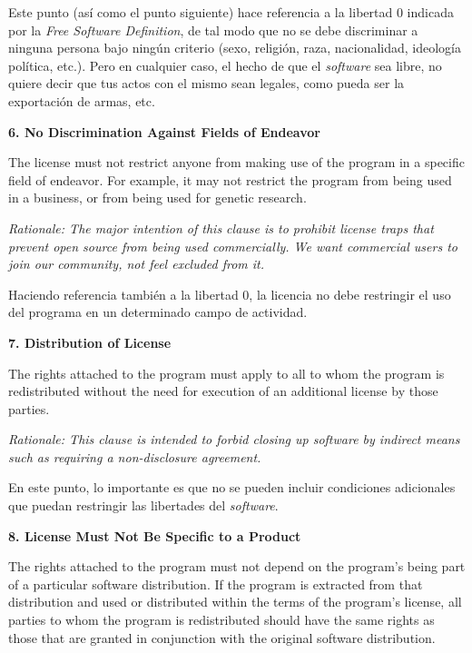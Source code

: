Este punto (así como el punto siguiente) hace referencia a la libertad 0
indicada por la \textit{Free Software Definition}, de tal modo que no se debe
discriminar a ninguna persona bajo ningún criterio (sexo, religión, raza,
nacionalidad, ideología política, etc.). Pero en cualquier caso, el hecho de que
el \textit{software} sea libre, no quiere decir que tus actos con el mismo sean
legales, como pueda ser la exportación de armas, etc.\newline

{\bf 6. No Discrimination Against Fields of Endeavor

The license must not restrict anyone from making use of the program in a
specific field of endeavor. For example, it may not restrict the program from
being used in a business, or from being used for genetic research.}

\textit{Rationale: The major intention of this clause is to prohibit license
traps that prevent open source from being used commercially. We want commercial
users to join our community, not feel excluded from it.}\newline

Haciendo referencia también a la libertad 0, la licencia no debe restringir el
uso del programa en un determinado campo de actividad.\newline

{\bf 7. Distribution of License

The rights attached to the program must apply to all to whom the program is
redistributed without the need for execution of an additional license by those
parties.}

\textit{Rationale: This clause is intended to forbid closing up software by
indirect means such as requiring a non-disclosure agreement.}\newline

En este punto, lo importante es que no se pueden incluir condiciones adicionales
que puedan restringir las libertades del \textit{software}.\newline

{\bf 8. License Must Not Be Specific to a Product

The rights attached to the program must not depend on the program's being part
of a particular software distribution. If the program is extracted from that
distribution and used or distributed within the terms of the program's license,
all parties to whom the program is redistributed should have the same rights as
those that are granted in conjunction with the original software distribution.}

